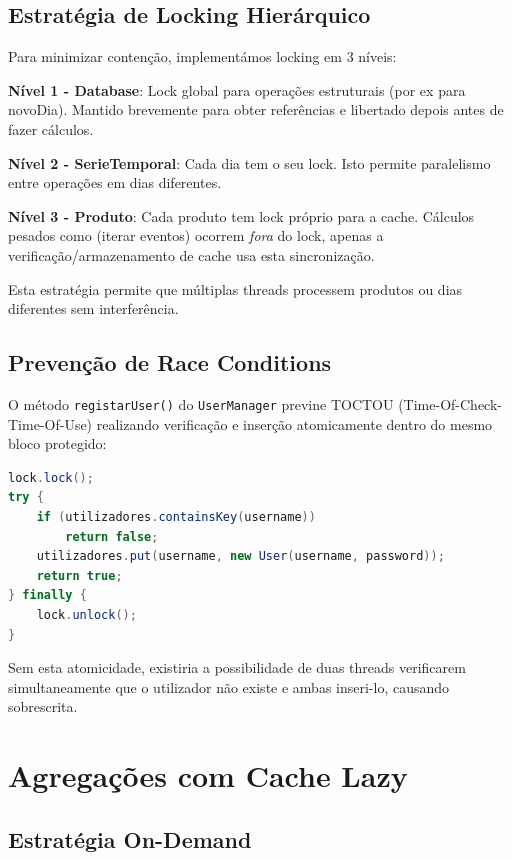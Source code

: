 \documentclass[11pt,a4paper]{article}
\begin{document}
\subsection{Estratégia de Locking Hierárquico}

Para minimizar contenção, implementámos locking em 3 níveis:

\textbf{Nível 1 - Database}: Lock global para operações estruturais (por ex para novoDia). Mantido brevemente para obter referências e libertado depois antes de fazer cálculos.

\textbf{Nível 2 - SerieTemporal}: Cada dia tem o seu lock. Isto permite paralelismo entre operações em dias diferentes.

\textbf{Nível 3 - Produto}: Cada produto tem lock próprio para a cache. Cálculos pesados como (iterar eventos) ocorrem \textit{fora} do lock, apenas a verificação/armazenamento de cache usa esta sincronização.

Esta estratégia permite que múltiplas threads processem produtos ou dias diferentes sem interferência.

\subsection{Prevenção de Race Conditions}

O método \texttt{registarUser()} do \texttt{UserManager} previne TOCTOU (Time-Of-Check-Time-Of-Use) realizando verificação e inserção atomicamente dentro do mesmo bloco protegido:

\begin{lstlisting}[language=Java]
lock.lock();
try {
    if (utilizadores.containsKey(username)) 
        return false;
    utilizadores.put(username, new User(username, password));
    return true;
} finally {
    lock.unlock();
}
\end{lstlisting}

Sem esta atomicidade, existiria a possibilidade de duas threads verificarem simultaneamente que o utilizador não existe e ambas inseri-lo, causando sobrescrita.

\section{Agregações com Cache Lazy}

\subsection{Estratégia On-Demand}
\end{document}
